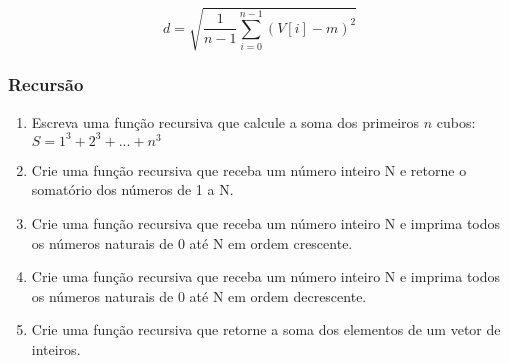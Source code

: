 \documentclass[a4paper,10pt]{article}
\begin{document}
\begin{multicols*}{2}
\begin{enumerate}
  \begin{equation*}
    d = \sqrt{\frac{1}{n - 1} \sum_{i = 0}^{n - 1} (V[i] - m)^2}
  \end{equation*}
\end{enumerate}

\subsubsection{Recursão}

\setlength{\leftmargini}{0pt}
\begin{enumerate}
  \item Escreva uma função recursiva que calcule a soma dos primeiros $n$ cubos: $S = 1^3 + 2^3 + ... + n^3$
  \item Crie uma função recursiva que receba um número inteiro N e retorne o somatório dos números de 1 a N.
  \item Crie uma função recursiva que receba um número inteiro N e imprima todos os números naturais de 0 até N em ordem crescente.
  \item Crie uma função recursiva que receba um número inteiro N e imprima todos os números naturais de 0 até N em ordem decrescente.

  \vfill\null
  \columnbreak
  \vspace*{0.0cm}

  \item Crie uma função recursiva que retorne a soma dos elementos de um vetor de inteiros.
\end{enumerate}
\end{multicols*}
\end{document}
